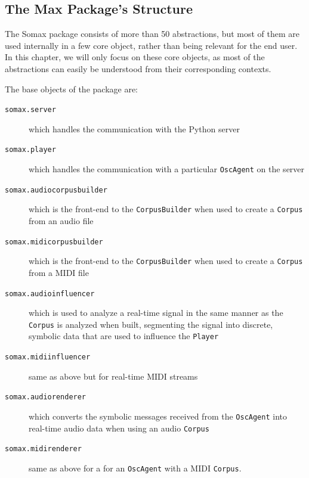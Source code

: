 
\subsection{The Max Package's Structure}\label{ssec:3-structure}
The Somax package consists of more than 50 abstractions, but most of them are used internally in a few core object, rather than being relevant for the end user. In this chapter, we will only focus on these core objects, as most of the abstractions can easily be understood from their corresponding contexts.

\noindent The base objects of the package are: 

\begin{description}
	\item[\texttt{somax.server}] which handles the communication with the Python server
	\item[\texttt{somax.player}] which handles the communication with a particular \texttt{OscAgent} on the server
	\item[\texttt{somax.audiocorpusbuilder}] which is the front-end to the \texttt{CorpusBuilder} when used to create a \texttt{Corpus} from an audio file
	\item[\texttt{somax.midicorpusbuilder}] which is the front-end to the \texttt{CorpusBuilder} when used to create a \texttt{Corpus} from a MIDI file
	\item[\texttt{somax.audioinfluencer}] which is used to analyze a real-time signal in the same manner as the \texttt{Corpus} is analyzed when built, segmenting the signal into discrete, symbolic data that are used to influence the \texttt{Player}
	\item[\texttt{somax.midiinfluencer}] same as above but for real-time MIDI streams
	\item[\texttt{somax.audiorenderer}] which converts the symbolic messages received from the \texttt{OscAgent} into real-time audio data when using an audio \texttt{Corpus}
	\item[\texttt{somax.midirenderer}] same as above for a for an \texttt{OscAgent} with a MIDI \texttt{Corpus}.
\end{description}


